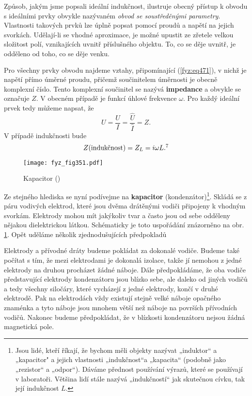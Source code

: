   Způsob, jakým jsme popsali ideální indukčnost, ilustruje obecný přístup k obvodu s ideálními 
  prvky obvykle nazývaném \emph{obvod se soustředěnými parametry}. Vlastnosti takových prvků lze 
  úplně popsat pomocí proudů a napětí na jejich svorkách. Udělají-li se vhodné aproximace, je možné 
  upustit ze zřetele velkou složitost polí, vznikajících uvnitř příslušného objektu. To, co se děje 
  uvnitř, je odděleno od toho, co se děje venku.
  
  Pro všechny prvky obvodu najdeme vztahy, připomínající (\ref{fyz:eq471}), v nichž je napětí přímo 
  úměrné proudu, přičemž součinitelem úměrnosti je obecně komplexní číslo. Tento komplexní 
  součinitel se nazývá \textbf{impedance} a obvykle se označuje \(Z\). V obecném případě je funkcí 
  úhlové frekvence \(\omega\). Pro každý ideální prvek tedy můžeme napsat, že
  \begin{equation}\label{fyz:eq472}
    U = \frac{U}{I} = \frac{\hat{U}}{\hat{I}} = Z.
  \end{equation}
  V případě indukčnosti bude
  \begin{equation}\label{fyz:eq473}
    Z(\text{indukčnost}) = Z_L = i\omega L.\footnotemark[7]
  \end{equation}

  
  \begin{figure}[ht!] %
    \centering
    \texttt{[image: fyz\_fig351.pdf]}
    \caption{Kapacitor
             (\cite[s.~392]{Feynman02})}
    \label{fyz:fig351}
  \end{figure}

  Ze stejného hlediska se nyní podívejme na \textbf{kapacitor} (kondenzátor)\footnote{Jsou lidé, 
  kteří říkají, že bychom měli objekty nazývat „induktor“ a „kapacitor" a jejich vlastnosti 
  „indukčnost“a „kapacita“ (podobně jako „rezistor“ a „odpor“). Dáváme přednost používání výrazů, 
  které se používají v laboratoři. Většina lidí stále nazývá „indukčností“ jak skutečnou cívku, tak 
  její indukčnost \(L\).}. Skládá se z páru vodivých elektrod, které jsou dvěma drátěnými vodiči 
  připojeny k vhodným svorkám. Elektrody mohou mít jakýkoliv tvar a často jsou od sebe odděleny 
  nějakou dielektrickou látkou. Schématicky je toto uspořádání znázorněno na obr. \ref{fyz:fig351}. 
  Opět uděláme několik zjednodušujících předpokladů

  Elektrody a přívodné dráty budeme pokládat za dokonalé vodiče. Budeme také počítat s tím, že mezi 
  elektrodami je dokonalá izolace, takže jí nemohou z jedné elektrody na druhou procházet žádné 
  náboje. Dále předpokládáme, že oba vodiče představující elektrody kondenzátoru jsou blízko sebe, 
  ale daleko od jiných vodičů a tedy všechny siločáry, které vycházejí z jedné elektrody, končí v 
  druhé elektrodě. Pak na elektrodách vždy existují stejně velké náboje opačného znaménka a tyto 
  náboje jsou mnohem větší než náboje na površích přívodních vodičů. Nakonec budeme předpokládat, 
  že v blízkosti kondenzátoru nejsou žádná magnetická pole. 
  
